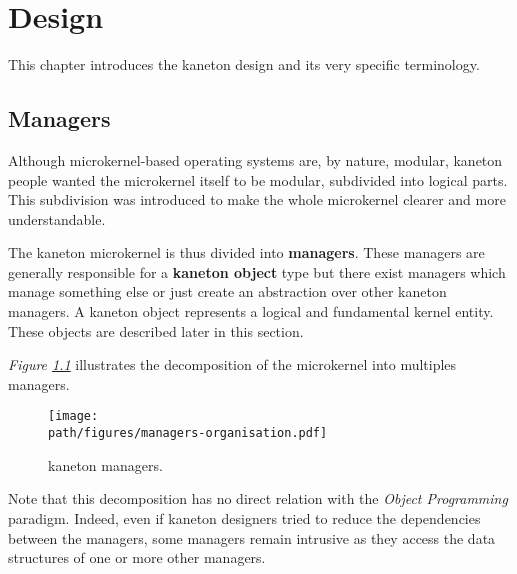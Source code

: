 %
%
%
%
%
%

%
%

\chapter{Design}
\label{chapter:design}

This chapter introduces the kaneton design and its very specific terminology.

\newpage

%
%

%
%

\section{Managers}

Although microkernel-based operating systems are, by nature, modular, kaneton
people wanted the microkernel itself to be modular, subdivided into logical
parts. This subdivision was introduced to make the whole microkernel clearer
and more understandable.

The kaneton microkernel is thus divided into \textbf{managers}. These
managers are generally responsible for a \textbf{kaneton object} type but there
exist managers which manage something else or just create an abstraction over
other kaneton managers. A kaneton object represents a logical and fundamental
kernel entity. These objects are described later in this section.

\textit{Figure \ref{figure:managers-organisation}} illustrates the
decomposition of the microkernel into multiples managers.

\begin{figure}[h]
  \begin{center}
    \texttt{[image: \\path/figures/managers-organisation.pdf]}
    \caption{kaneton managers.}
    \label{figure:managers-organisation}
  \end{center}
\end{figure}

Note that this decomposition has no direct relation with the \textit{Object
Programming} paradigm. Indeed, even if kaneton designers tried to reduce the
dependencies between the managers, some managers remain intrusive as they
access the data structures of one or more other managers.

